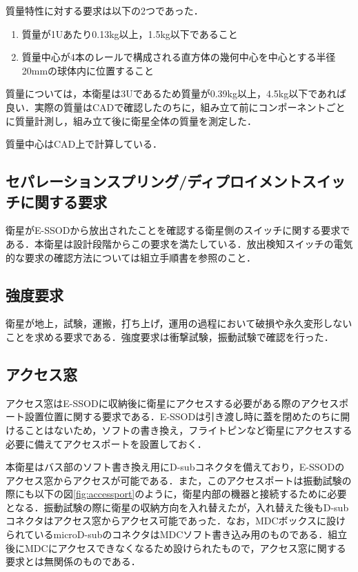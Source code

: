 質量特性に対する要求は以下の2つであった．

\begin{enumerate}
	\item 質量が1Uあたり0.13kg以上，1.5kg以下であること
	\item 質量中心が4本のレールで構成される直方体の幾何中心を中心とする半径20mmの球体内に位置すること
\end{enumerate}

質量については，本衛星は3Uであるため質量が0.39kg以上，4.5kg以下であれば良い．実際の質量はCADで確認したのちに，組み立て前にコンポーネントごとに質量計測し，組み立て後に衛星全体の質量を測定した．

質量中心はCAD上で計算している．

\subsection{セパレーションスプリング/ディプロイメントスイッチに関する要求}

衛星がE-SSODから放出されたことを確認する衛星側のスイッチに関する要求である．本衛星は設計段階からこの要求を満たしている．放出検知スイッチの電気的な要求の確認方法については組立手順書を参照のこと．

\subsection{強度要求}
衛星が地上，試験，運搬，打ち上げ，運用の過程において破損や永久変形しないことを求める要求である．強度要求は衝撃試験，振動試験で確認を行った．

\subsection{アクセス窓}
アクセス窓はE-SSODに収納後に衛星にアクセスする必要がある際のアクセスポート設置位置に関する要求である．E-SSODは引き渡し時に蓋を閉めたのちに開けることはないため，ソフトの書き換え，フライトピンなど衛星にアクセスする必要に備えてアクセスポートを設置しておく．

本衛星はバス部のソフト書き換え用にD-subコネクタを備えており，E-SSODのアクセス窓からアクセスが可能である．また，このアクセスポートは振動試験の際にも以下の図\ref{fig:accessport}のように，衛星内部の機器と接続するために必要となる．振動試験の際に衛星の収納方向を入れ替えたが，入れ替えた後もD-subコネクタはアクセス窓からアクセス可能であった．なお，MDCボックスに設けられているmicroD-subのコネクタはMDCソフト書き込み用のものである．組立後にMDCにアクセスできなくなるため設けられたもので，アクセス窓に関する要求とは無関係のものである．

